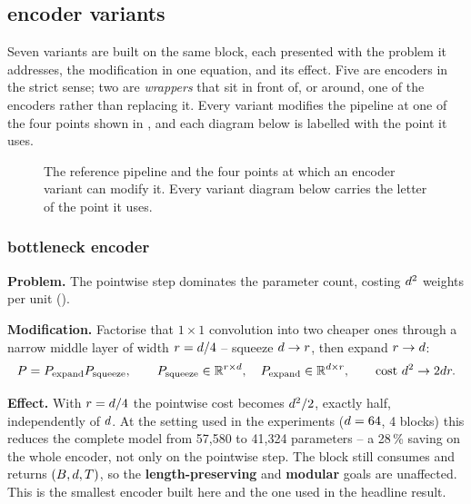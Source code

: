 \subsection{\seanet{} encoder variants}
\label{sec:arch:variants}

Seven variants are built on the same block, each presented with the problem it addresses, the
modification in one equation, and its effect. Five are encoders in the strict sense; two are
\emph{wrappers} that sit in front of, or around, one of the encoders rather than replacing it. Every
variant modifies the pipeline at one of the four points shown in , and each
diagram below is labelled with the point it uses.

\begin{figure}[htbp]
  \centering
  
  \caption{The reference \seanet{} pipeline and the four points at which an encoder variant can
  modify it. Every variant diagram below carries the letter of the point it uses.}
  \label{fig:attach_points}
\end{figure}

\subsubsection{\seanet{} bottleneck encoder}
\label{sec:var:bottleneck}

\textbf{Problem.} The pointwise step dominates the parameter count, costing $d^2$ weights per
unit ().

\textbf{Modification.} Factorise that $1\times1$ convolution into two cheaper ones through a narrow
middle layer of width $r = d/4$ -- squeeze $d \to r$, then expand $r \to d$:
\begin{equation}
  P = P_{\text{expand}} P_{\text{squeeze}}, \qquad
  P_{\text{squeeze}} \in \mathbb{R}^{r \times d}, \quad
  P_{\text{expand}} \in \mathbb{R}^{d \times r},
  \qquad \text{cost } d^2 \rightarrow 2d r .
  \label{eq:bottleneck}
\end{equation}

\textbf{Effect.} With $r = d/4$ the pointwise cost becomes $d^2/2$, exactly half,
independently of $d$. At the setting used in the experiments ($d = 64$, 4 blocks) this
reduces the complete model from 57{,}580 to 41{,}324 parameters -- a 28\,\% saving on the whole
encoder, not only on the pointwise step. The block still consumes and returns
$(B, d, T)$, so the \textbf{length-preserving} and \textbf{modular} goals are
unaffected. This is the smallest encoder built here
and the one used in the headline result.

